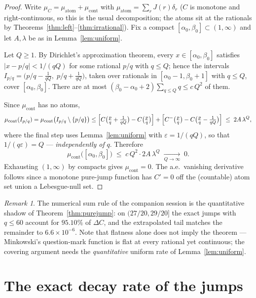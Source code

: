 \documentclass[11pt]{article}
\theoremstyle{definition}
\theoremstyle{remark}
\newtheorem{remark}[theorem]{Remark}
\begin{document}
\begin{proof}
Write $\mu_C = \mu_{\mathrm{atom}} + \mu_{\mathrm{cont}}$ with
$\mu_{\mathrm{atom}} = \sum_r J(r)\delta_r$ ($C$ is monotone and
right-continuous, so this is the usual decomposition; the atoms sit at
the rationals by Theorems~\ref{thm:left}--\ref{thm:irrational}).
Fix a compact $[\alpha_0, \beta_0] \subset (1,\infty)$ and let
$A, \lambda$ be as in Lemma~\ref{lem:uniform}.

Let $Q \geq 1$.
By Dirichlet's approximation theorem, every $x \in [\alpha_0, \beta_0]$
satisfies $|x - p/q| < 1/(qQ)$ for some rational $p/q$ with
$q \leq Q$; hence the intervals
$I_{p/q} = \bigl(p/q - \tfrac{1}{qQ},\; p/q + \tfrac{1}{qQ}\bigr)$,
taken over rationals in $[\alpha_0 - 1, \beta_0 + 1]$ with $q \leq Q$,
cover $[\alpha_0, \beta_0]$.
There are at most $(\beta_0 - \alpha_0 + 2)\sum_{q \leq Q} q
\leq c\,Q^2$ of them.

Since $\mu_{\mathrm{cont}}$ has no atoms,
\[
\mu_{\mathrm{cont}}(I_{p/q})
= \mu_{\mathrm{cont}}\bigl(I_{p/q} \setminus \{p/q\}\bigr)
\leq \Bigl[C\bigl(\tfrac{p}{q} + \tfrac{1}{qQ}\bigr) - C\bigl(\tfrac{p}{q}\bigr)\Bigr]
+ \Bigl[C^-\bigl(\tfrac{p}{q}\bigr) - C\bigl(\tfrac{p}{q} - \tfrac{1}{qQ}\bigr)\Bigr]
\;\leq\; 2A\,\lambda^{Q},
\]
where the final step uses Lemma~\ref{lem:uniform} with
$\varepsilon = 1/(qQ)$, so that $1/(q\varepsilon) = Q$ ---
\emph{independently of} $q$.
Therefore
\[
\mu_{\mathrm{cont}}\bigl([\alpha_0, \beta_0]\bigr)
\;\leq\; c\,Q^2 \cdot 2A\,\lambda^{Q}
\;\xrightarrow[Q \to \infty]{}\; 0 .
\]
Exhausting $(1,\infty)$ by compacts gives $\mu_{\mathrm{cont}} = 0$.
The a.e.\ vanishing derivative follows since a monotone pure-jump
function has $C' = 0$ off the (countable) atom set union a Lebesgue-null
set.
\end{proof}

\begin{remark}
The numerical sum rule of the companion session is the quantitative
shadow of Theorem~\ref{thm:purejump}: on $(27/20, 29/20]$ the exact
jumps with $q \leq 60$ account for $95.10\%$ of $\Delta C$, and the
extrapolated tail matches the remainder to $6.6 \times 10^{-6}$.
Note that flatness alone does not imply the theorem --- Minkowski's
question-mark function is flat at every rational yet continuous; the
covering argument needs the \emph{quantitative} uniform rate of
Lemma~\ref{lem:uniform}.
\end{remark}

\section{The exact decay rate of the jumps}
\end{document}
